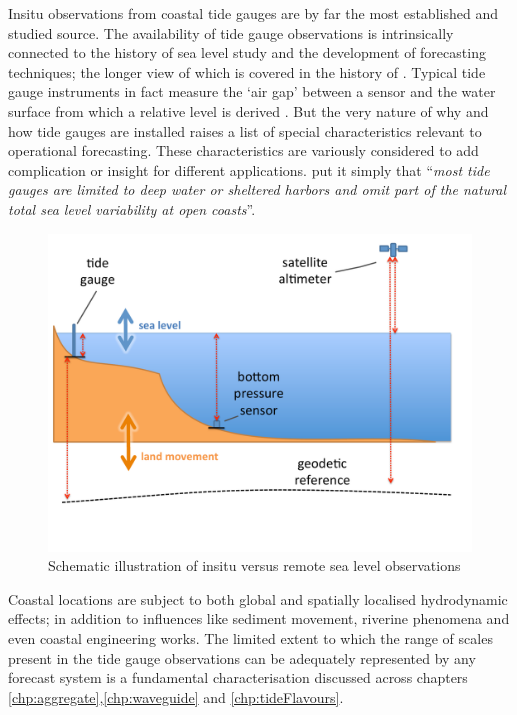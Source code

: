 Insitu observations from coastal tide gauges are by far the most established and studied source.    The availability of tide gauge observations is intrinsically connected to the history of sea level study and the development of forecasting techniques; the longer view of which is covered in the history of \citeauthor{Cartwright:2000tt}.
Typical tide gauge instruments in fact measure the `air gap' between a sensor and the water surface from which a relative level is derived \citep{PCTMSL-sp9}. 
But the very nature of why and how tide gauges are installed raises a list of special characteristics relevant to operational forecasting. These characteristics are variously considered to add complication or insight for different applications. \citeauthor{10.1175/jtech-d-18-0203.1} put it simply that ``\textit{most tide gauges are limited to deep water or sheltered harbors and omit part of the natural total sea level variability at open coasts}''.   
\begin{figure}[!hbt]\centering
  \includegraphics[width=\figwidthBig]{figures/diagrams/sealevel_cartoon.pdf}
  \caption{Schematic illustration of insitu versus remote sea level observations}
  \label{fig:sealevelObsCartoon}
\end{figure}
Coastal locations are subject to both global and spatially localised hydrodynamic effects; in addition to influences like sediment movement, riverine phenomena and even coastal engineering works.  The limited extent to which the range of scales present in the tide gauge observations can be adequately represented by any forecast system is a fundamental characterisation discussed across chapters \ref{chp:aggregate},\ref{chp:waveguide} and \ref{chp:tideFlavours}.    
